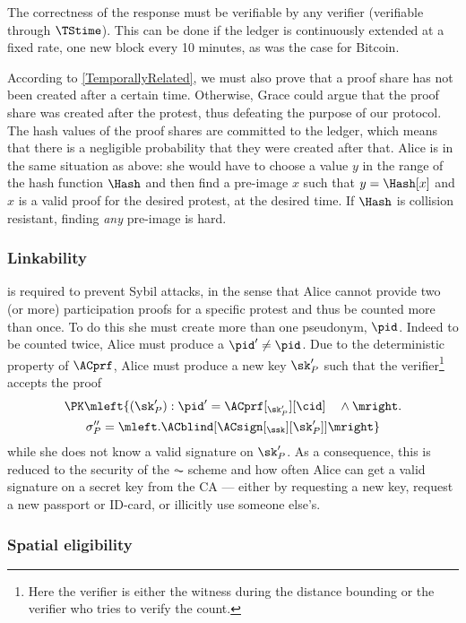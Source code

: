 The correctness of the response must be verifiable by any verifier (verifiable 
through \(\TStime\)).
This can be done if the ledger is continuously extended at a fixed rate, \eg 
one new block every 10 minutes, as was the case for Bitcoin.

According to \cref{TemporallyRelated}, we must also prove that a proof share has not been created after a certain time.
Otherwise, Grace could argue that the proof share was created after the protest, thus defeating the purpose of our protocol.
The hash values of the proof shares are committed to the ledger, which means 
that there is a negligible probability that they were created after that.
Alice is in the same situation as above:
she would have to choose a value \(y\) in the range of the hash function 
\(\Hash\) and then find a pre-image \(x\) such that \(y = \Hash[x]\) and \(x\) 
is a valid proof for the desired protest, at the desired time.
If \(\Hash\) is collision resistant, finding \emph{any} pre-image is hard.

\subsubsection{Linkability}%
\label{analysis-linkability}

 is required to prevent Sybil attacks, in the sense
that Alice cannot provide two (or more) participation proofs for a
specific protest and thus be counted more than once.
To do this she must create more than one pseudonym, \(\pid\).
Indeed to be counted twice, Alice must produce a \(\pid'\neq \pid\).
Due to the deterministic property of \(\ACprf\), Alice must produce a new key 
\(\sk_P'\) such that the verifier\footnote{%
  Here the verifier is either the witness during the distance bounding or the 
  verifier who tries to verify the count.
} accepts the proof
\begin{multline*}
\PK\mleft\{ (\sk_P') : \pid' = \ACprf[_{\sk_P'}][\cid] \quad \land \mright. \\
    \sigma_P'' = \mleft. \ACblind[\ACsign[_{\ssk}][\sk_P']] \mright\}
\end{multline*}
while she does not know a valid signature on \(\sk_P'\).
As a consequence, this is reduced to the security of the \(\AC\) scheme and how 
often Alice can get a valid signature on a secret key from the \ac{CA} --- 
either by requesting a new key, \eg request a new passport or ID-card, or 
illicitly use someone else's.

\subsubsection{Spatial eligibility}%
\label{analysis-spatial}


